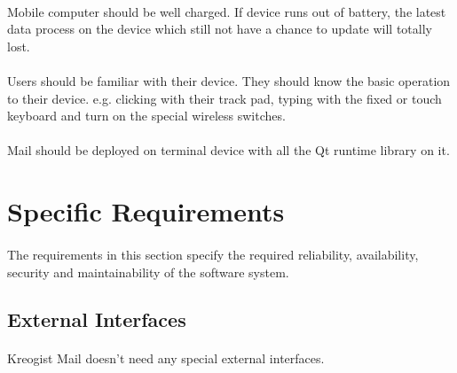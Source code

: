 \documentclass[11pt,a4paper]{article}
\begin{document}
			\paragraph{} Mobile computer should be well charged. If device runs out of battery, the latest data process on the device which still not have a chance to update will totally lost.
			\paragraph{} Users should be familiar with their device. They should know the basic operation to their device. e.g. clicking with their track pad, typing with the fixed or touch keyboard and turn on the special wireless switches.
            \paragraph{} Mail should be deployed on terminal device with all the Qt runtime library on it.
	\clearpage
    \section{Specific Requirements}
    	\paragraph{} The requirements in this section specify the required reliability, availability, security and maintainability of the software system.
        \subsection{External Interfaces}
        	\paragraph{} Kreogist Mail doesn't need any special external interfaces.
\end{document}
